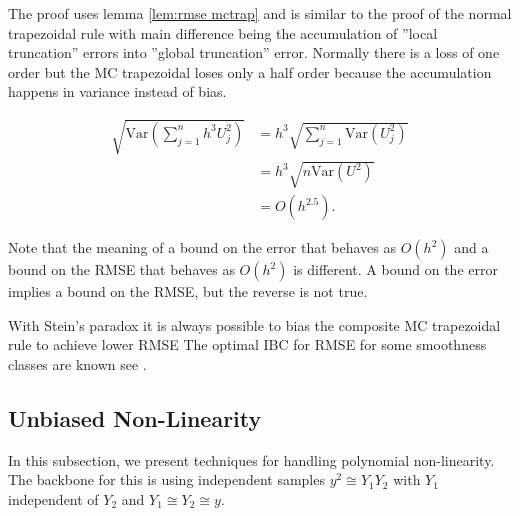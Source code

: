 \documentclass[a4paper,12pt]{article}
\begin{document}
The proof uses lemma \ref{lem:rmse mctrap}
and is similar to the proof of the normal
trapezoidal rule with main difference being  the
accumulation of ''local truncation'' errors into ''global truncation'' error.
Normally there is a loss of one order but the MC trapezoidal loses only a half order
because the accumulation happens in variance instead of bias.

\begin{align}
    \sqrt{\text{Var}\left(\sum_{j=1}^{n} h^{3}U_{j}^{2}\right)}
     & =h^{3} \sqrt{ \sum_{j=1}^{n}\text{Var} (U_{j}^{2})} \\
     & =h^{3} \sqrt{ n \text{Var}(U^{2})}                  \\
     & = O(h^{2.5}).
\end{align}

Note that the meaning of a bound on the error that behaves as $O(h^{2})$ and
a bound on the RMSE that behaves as $O(h^{2})$ is different.
A bound on the error implies a bound on the RMSE, but
the reverse is not true.

\begin{related}
    With Stein's paradox it is always possible to bias the composite MC trapezoidal
    rule to achieve lower RMSE
    The optimal IBC for RMSE for some smoothness classes
    are known see \cite{heinrich_optimal_2001}.
\end{related}



\subsection{Unbiased Non-Linearity}

In this subsection, we present techniques for handling polynomial non-linearity.
The backbone for this is using independent samples
$y^{2} \cong Y_{1} Y_{2}$ with $Y_{1}$ independent of $ Y_{2}$ and
$Y_{1} \cong Y_{2} \cong y$.
\end{document}
